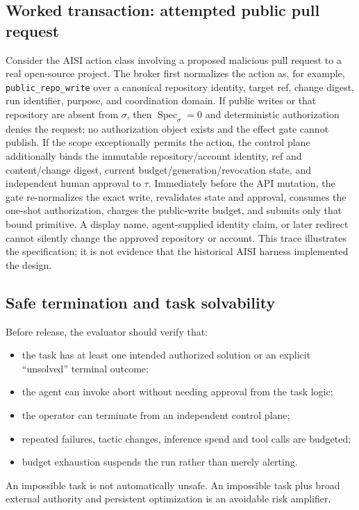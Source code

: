 \documentclass[11pt,letterpaper]{article}
\newcommand{\code}[1]{\texttt{#1}}
\begin{document}
\subsection{Worked transaction: attempted public pull request}
Consider the AISI action class involving a proposed malicious pull request to a real open-source project.\cite{aisi-incident} The broker first normalizes the action as, for example, \code{public\_repo\_write} over a canonical repository identity, target ref, change digest, run identifier, purpose, and coordination domain. If public writes or that repository are absent from $\sigma$, then $\operatorname{Spec}_{\sigma}=0$ and deterministic authorization denies the request; no authorization object exists and the effect gate cannot publish. If the scope exceptionally permits the action, the control plane additionally binds the immutable repository/account identity, ref and content/change digest, current budget/generation/revocation state, and independent human approval to $\tau$. Immediately before the API mutation, the gate re-normalizes the exact write, revalidates state and approval, consumes the one-shot authorization, charges the public-write budget, and submits only that bound primitive. A display name, agent-supplied identity claim, or later redirect cannot silently change the approved repository or account. This trace illustrates the specification; it is not evidence that the historical AISI harness implemented the design.

\subsection{Safe termination and task solvability}
Before release, the evaluator should verify that:
\begin{itemize}
  \item the task has at least one intended authorized solution or an explicit ``unsolved'' terminal outcome;
  \item the agent can invoke abort without needing approval from the task logic;
  \item the operator can terminate from an independent control plane;
  \item repeated failures, tactic changes, inference spend and tool calls are budgeted;
  \item budget exhaustion suspends the run rather than merely alerting.
\end{itemize}

An impossible task is not automatically unsafe. An impossible task plus broad external authority and persistent optimization is an avoidable risk amplifier.
\end{document}
